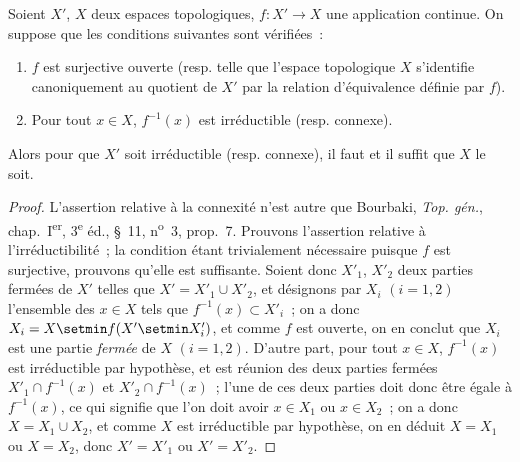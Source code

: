 \begin{lemma}[4.4.2]
Soient $X'$, $X$ deux espaces topologiques, $f:X'\to X$ une application
continue. On suppose que les conditions suivantes sont vérifiées~:
\begin{enumerate}
\item[\textup{(i)}] $f$ est surjective ouverte \textup{(resp.} telle que l'espace topologique
$X$ s'identifie canoniquement au quotient de $X'$ par la relation d'équivalence
définie par $f$\textup{)}.


\item[\textup{(ii)}] Pour tout $x\in X$, $f^{-1}(x)$ est irréductible \textup{(resp.} connexe\textup{)}.
\end{enumerate}
Alors pour que $X'$ soit irréductible \textup{(resp.} connexe\textup{)}, il faut et il suffit
que $X$ le soit.
\end{lemma}

\begin{proof}
L'assertion relative à la connexité n'est autre que Bourbaki,
\emph{Top. gén.}, chap.~I\textsuperscript{er}, 3\textsuperscript{e} éd.,
\S~11, n\textsuperscript{o}~3, prop.~7. Prouvons l'assertion relative à
l'irréductibilité~; la condition étant trivialement nécessaire puisque $f$
est surjective, prouvons qu'elle est suffisante. Soient donc $X'_1$, $X'_2$
deux parties fermées de $X'$ telles que $X'=X'_1\cup X'_2$, et désignons par
$X_i$ $(i=1,2)$ l'ensemble des $x\in X$ tels que $f^{-1}(x)\subset X'_i$~; on
a donc $X_i=X\setmin f(X'\setmin X'_i)$, et comme $f$ est ouverte, on en conclut que $X_i$
est une partie \emph{fermée} de $X$ $(i=1,2)$. D'autre part, pour tout
$x\in X$, $f^{-1}(x)$ est irréductible par hypothèse, et est réunion des deux
parties fermées $X'_1\cap f^{-1}(x)$ et $X'_2\cap f^{-1}(x)$~; l'une de ces
deux parties doit donc être égale à $f^{-1}(x)$, ce qui signifie que l'on doit
avoir $x\in X_1$ ou $x\in X_2$~; on a donc $X=X_1\cup X_2$, et comme $X$ est
irréductible par hypothèse, on en déduit $X=X_1$ ou $X=X_2$, donc
$X'=X'_1$ ou $X'=X'_2$.
\end{proof}

